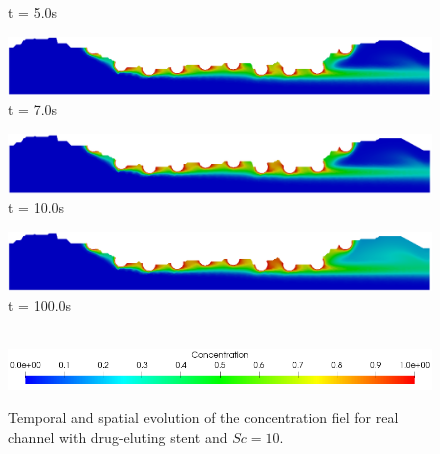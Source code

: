 \begin{figure}[H]
\begin{minipage}{.50\linewidth}
      t = 5.0s
     \end{minipage}%
     \begin{minipage}{.50\linewidth}
      \centering
      \includegraphics[scale=0.18]{./02_chaps/cap_solution/figure/conc10_RealStrut6.png}\\
      t = 7.0s
     \end{minipage}
     \begin{minipage}{.50\linewidth}
     \medskip
      \centering
      \includegraphics[scale=0.18]{./02_chaps/cap_solution/figure/conc10_RealStrut7.png}\\
      t = 10.0s
     \end{minipage}%
     \begin{minipage}{.50\linewidth}
     \medskip
      \centering
      \includegraphics[scale=0.18]{./02_chaps/cap_solution/figure/conc10_RealStrut8.png}\\
      t = 100.0s
     \end{minipage}\\[10pt]
      \centering
      \includegraphics[scale=0.5]{./02_chaps/cap_solution/figure/conc1_RealStrutScale.png}\\
     \medskip
    \caption{
Temporal and spatial evolution of the concentration fiel for real channel with drug-eluting stent and $Sc=10$.}
     \label{conc field real stent sc 10}
\end{figure}



